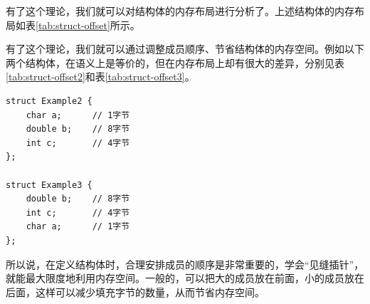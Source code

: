 有了这个理论，我们就可以对结构体的内存布局进行分析了。上述结构体的内存布局如表\cref{tab:struct-offset}所示。

有了这个理论，我们就可以通过调整成员顺序、节省结构体的内存空间。例如以下两个结构体，在语义上是等价的，但在内存布局上却有很大的差异，分别见表\cref{tab:struct-offset2}和表\cref{tab:struct-offset3}。


\begin{verbatim}
struct Example2 {
    char a;      // 1字节
    double b;    // 8字节
    int c;       // 4字节
};

struct Example3 {
    double b;    // 8字节
    int c;       // 4字节
    char a;      // 1字节
};
\end{verbatim}

所以说，在定义结构体时，合理安排成员的顺序是非常重要的，学会“见缝插针”，就能最大限度地利用内存空间。一般的，可以把大的成员放在前面，小的成员放在后面，这样可以减少填充字节的数量，从而节省内存空间。

